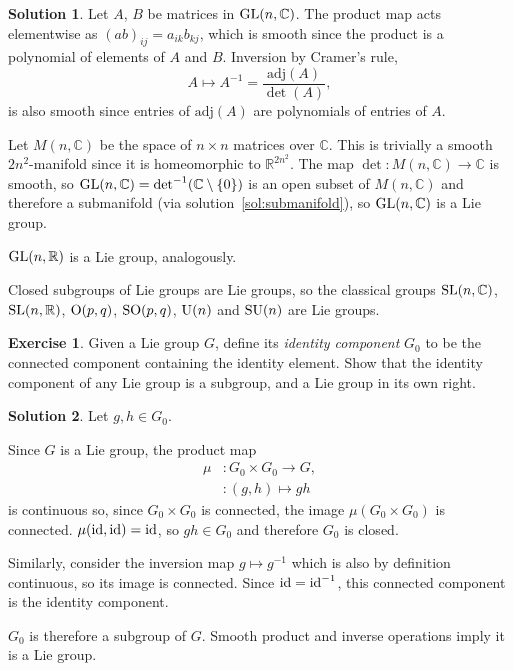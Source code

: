 \documentclass[11pt, a4paper]{report}
\theoremstyle{definition}
\newtheorem{exercise}{Exercise}[part]
\newtheorem{solution}{Solution}[part]
\newenvironment{ex}{\begin{exercise}}{\end{exercise}\pagebreak[1]}
\newenvironment{sol}{\begin{solution}}{\end{solution}\pagebreak[3]}
\newcommand*{\GL}{\ensuremath\text{GL}}
\newcommand*{\SL}{\ensuremath\text{SL}}
\renewcommand*{\O}{\ensuremath\text{O}}
\newcommand*{\SO}{\ensuremath\text{SO}}
\newcommand*{\U}{\ensuremath\text{U}}
\newcommand*{\SU}{\ensuremath\text{SU}}
\newcommand*{\op}[1]{\ensuremath\mathop{}\mathopen{}#1}
\newcommand*{\id}{\op{\mathrm{id}}}
\begin{document}
\begin{sol}

Let $A$, $B$ be matrices in $\GL(n, \mathbb{C})$. The product map acts elementwise as ${(ab)}_{ij} = a_{ik} b_{kj}$,
which is smooth since the product is a polynomial of elements of $A$ and $B$.
Inversion by Cramer's rule,
\[
    A \mapsto A^{-1} = \frac{\text{adj}(A)}{\det(A)},
\]
is also smooth since entries of $\text{adj}(A)$ are polynomials of entries of $A$.

Let $M(n, \mathbb{C})$ be the space of $n \times n$ matrices over $\mathbb{C}$.
This is trivially a smooth $2n^2$-manifold since it is homeomorphic to $\mathbb{R}^{2n^2}$.
The map $\det : M(n, \mathbb{C}) \to \mathbb{C}$ is smooth, so $\GL(n, \mathbb{C}) = \det^{-1}(\mathbb{C} \setminus \{0\})$ is an open subset of $M(n, \mathbb{C})$ and therefore a submanifold (via solution~\ref{sol:submanifold}), so $\GL(n, \mathbb{C})$ is a Lie group.

$\GL(n, \mathbb{R})$ is a Lie group, analogously.

Closed subgroups of Lie groups are Lie groups, so the classical groups $\SL(n, \mathbb{C})$, $\SL(n, \mathbb{R})$, $\O(p, q)$, $\SO(p, q)$, $\U(n)$ and $\SU(n)$ are Lie groups.

\end{sol}

\begin{ex}

Given a Lie group $G$, define its \emph{identity component} $G_0$ to be the connected component containing the identity element.
Show that the identity component of any Lie group is a subgroup, and a Lie group in its own right.

\end{ex}

\begin{sol}

Let $g, h \in G_0$.

Since $G$ is a Lie group, the product map
\begin{align*}
    \mu &: G_0 \times G_0 \to G, \\
        &: (g, h) \mapsto gh
\end{align*}
is continuous so, since $G_0 \times G_0$ is connected, the image $\mu(G_0 \times G_0)$ is connected. $\mu(\id, \id) = \id$, so $gh \in G_0$ and therefore $G_0$ is closed.

Similarly, consider the inversion map $g \mapsto g^{-1}$ which is also by definition continuous, so its image is connected. Since $\id = \id^{-1}$, this connected component is the identity component.

$G_0$ is therefore a subgroup of $G$. Smooth product and inverse operations imply it is a Lie group.

\end{sol}
\end{document}
